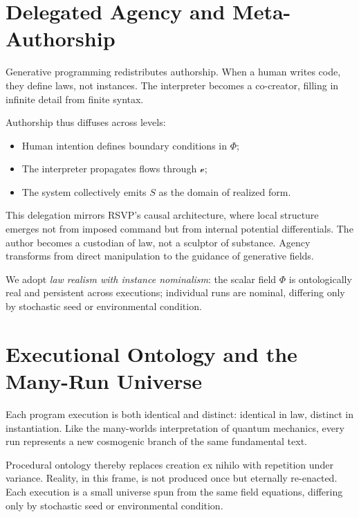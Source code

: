\documentclass[12pt,a4paper]{article}
\theoremstyle{plain}
\theoremstyle{definition}
\theoremstyle{remark}
\newcommand{\Phifield}{\Phi}
\newcommand{\vfield}{\mathcal{v}}
\newcommand{\Sfield}{S}
\begin{document}
\section{Delegated Agency and Meta-Authorship}
\label{sec:agency}

Generative programming redistributes authorship. When a human writes code, they define laws, not instances. The interpreter becomes a co-creator, filling in infinite detail from finite syntax.

Authorship thus diffuses across levels:
\begin{itemize}
    \item Human intention defines boundary conditions in $\Phifield$;
    \item The interpreter propagates flows through $\vfield$;
    \item The system collectively emits $\Sfield$ as the domain of realized form.
\end{itemize}

This delegation mirrors RSVP’s causal architecture, where local structure emerges not from imposed command but from internal potential differentials. The author becomes a custodian of law, not a sculptor of substance. Agency transforms from direct manipulation to the guidance of generative fields.

We adopt \emph{law realism with instance nominalism}: the scalar field $\Phifield$ is ontologically real and persistent across executions; individual runs are nominal, differing only by stochastic seed or environmental condition.

\section{Executional Ontology and the Many-Run Universe}
\label{sec:many-run}

Each program execution is both identical and distinct: identical in law, distinct in instantiation. Like the many-worlds interpretation of quantum mechanics, every run represents a new cosmogenic branch of the same fundamental text.

Procedural ontology thereby replaces creation ex nihilo with repetition under variance. Reality, in this frame, is not produced once but eternally re-enacted. Each execution is a small universe spun from the same field equations, differing only by stochastic seed or environmental condition.
\end{document}
